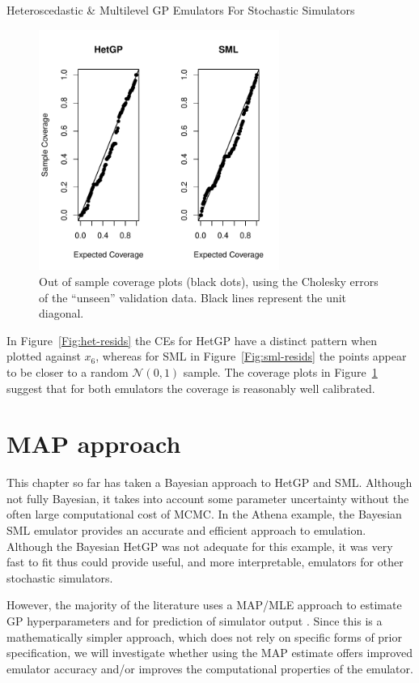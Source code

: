 \begin{chapter}{Heteroscedastic \& Multilevel GP Emulators For Stochastic Simulators\label{Ch:Hetsml}}
\begin{figure}[!ht]
\end{figure}
\begin{figure}[!ht]
  \centering
\includegraphics[width = 0.7\textwidth]{sml-het-fig2/coverage-new3.pdf}
  \caption{Out of sample coverage plots (black dots), using the Cholesky errors of the ``unseen'' validation data. Black lines represent the unit diagonal. \label{Fig:coverage}}
\end{figure}
In Figure~\ref{Fig:het-resids} the CEs for HetGP have a distinct pattern when plotted against $x_6$, whereas for SML in Figure~\ref{Fig:sml-resids} the points appear to be closer to a random $\mathcal{N}(0,1)$ sample. The coverage plots in Figure~\ref{Fig:coverage} suggest that for both emulators the coverage is reasonably well calibrated.

\section{MAP approach}

This chapter so far has taken a Bayesian approach to HetGP and SML. Although not fully Bayesian, it takes into account some parameter uncertainty without the often large computational cost of MCMC. In the Athena example, the Bayesian SML emulator provides an accurate and efficient approach to emulation. Although the Bayesian HetGP was not adequate for this example, it was very fast to fit thus could provide useful, and more interpretable, emulators for other stochastic simulators.

However, the majority of the literature uses a MAP/MLE approach to estimate GP hyperparameters and for prediction of simulator output \citep{Binois2018, Baker2020c,Baker2020a, Baker2022, Zhang2022}. Since this is a mathematically simpler approach, which does not rely on specific forms of prior specification, we will investigate whether using the MAP estimate offers improved emulator accuracy and/or improves the computational properties of the emulator.


\end{chapter}
